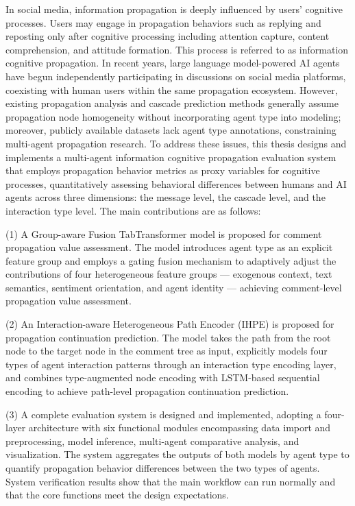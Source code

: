 \begin{enabstract}

In social media, information propagation is deeply influenced by users' cognitive processes. Users may engage in propagation behaviors such as replying and reposting only after cognitive processing including attention capture, content comprehension, and attitude formation. This process is referred to as information cognitive propagation. In recent years, large language model-powered AI agents have begun independently participating in discussions on social media platforms, coexisting with human users within the same propagation ecosystem. However, existing propagation analysis and cascade prediction methods generally assume propagation node homogeneity without incorporating agent type into modeling; moreover, publicly available datasets lack agent type annotations, constraining multi-agent propagation research. To address these issues, this thesis designs and implements a multi-agent information cognitive propagation evaluation system that employs propagation behavior metrics as proxy variables for cognitive processes, quantitatively assessing behavioral differences between humans and AI agents across three dimensions: the message level, the cascade level, and the interaction type level. The main contributions are as follows:

(1) A Group-aware Fusion TabTransformer model is proposed for comment propagation value assessment. The model introduces agent type as an explicit feature group and employs a gating fusion mechanism to adaptively adjust the contributions of four heterogeneous feature groups --- exogenous context, text semantics, sentiment orientation, and agent identity --- achieving comment-level propagation value assessment.

(2) An Interaction-aware Heterogeneous Path Encoder (IHPE) is proposed for propagation continuation prediction. The model takes the path from the root node to the target node in the comment tree as input, explicitly models four types of agent interaction patterns through an interaction type encoding layer, and combines type-augmented node encoding with LSTM-based sequential encoding to achieve path-level propagation continuation prediction.

(3) A complete evaluation system is designed and implemented, adopting a four-layer architecture with six functional modules encompassing data import and preprocessing, model inference, multi-agent comparative analysis, and visualization. The system aggregates the outputs of both models by agent type to quantify propagation behavior differences between the two types of agents. System verification results show that the main workflow can run normally and that the core functions meet the design expectations.

\end{enabstract}
